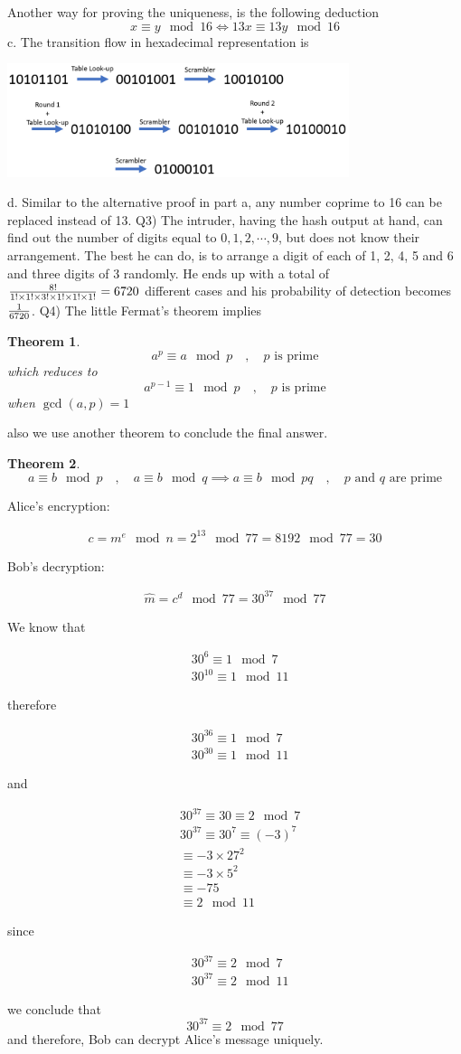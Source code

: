 \documentclass[10pt,letterpaper]{article}
\newcommand{\eqn}[2]{
\begin{equation}
\begin{split}
#1
\label{#2}
\end{split}
\end{equation}
}
\newtheorem{theorem}{Theorem}
\begin{document}
Another way for proving the uniqueness, is the following deduction
$$
x\equiv y\mod 16\iff 13x\equiv 13y\mod 16
$$
c. The transition flow in hexadecimal representation is
\begin{center}
\includegraphics[width=100mm]{Trans.png}
\end{center}
d. Similar to the alternative proof in part a, any number coprime to 16 can be replaced instead of 13.
\newline\newline
Q3) The intruder, having the hash output at hand, can find out the number of digits equal to $0,1,2,\cdots ,9$, but does not know their arrangement. The best he can do, is to arrange a digit of each of 1, 2, 4, 5 and 6 and three digits of 3 randomly. He ends up with a total of 
$
{8!\over 1!\times1!\times3!\times1!\times1!\times1!}=6720
$
 different cases and his probability of detection becomes $1\over 6720$.
\newline\newline
Q4) The little Fermat's theorem implies
\begin{theorem}
$$
a^p\equiv a\mod p\quad,\quad p\text{ is prime}
$$
which reduces to
$$
a^{p-1}\equiv 1\mod p\quad,\quad p\text{ is prime}
$$
when $\gcd(a,p)=1$
\end{theorem}
also we use another theorem to conclude the final answer.
\begin{theorem}
$$
a\equiv b\mod p\quad,\quad a\equiv b\mod q\implies a\equiv b\mod pq\quad,\quad p\text{ and }q\text{ are prime}
$$
\end{theorem}
Alice's encryption:
\eqn{
c=m^e\mod n=2^{13}\mod 77=8192\mod 77=30
}{}
Bob's decryption:
\eqn{
\hat m=c^d\mod 77=30^{37}\mod 77
}{}
We know that
\eqn{
&30^6\equiv 1\mod 7
\\&
30^{10}\equiv 1\mod 11
}{}
therefore
\eqn{
&30^{36}\equiv 1\mod 7
\\&
30^{30}\equiv 1\mod 11
}{}
and
\eqn{
&30^{37}\equiv 30\equiv2\mod 7
\\&
30^{37}\equiv 30^7\equiv (-3)^7
\\&
\equiv -3\times 27^2
\\&
\equiv -3\times 5^2
\\&
\equiv -75
\\&
\equiv 2\mod 11
}{}
since
\eqn{
&30^{37}\equiv 2\mod 7
\\&30^{37}\equiv 2\mod 11
}{}
we conclude that
$$
30^{37}\equiv 2\mod 77
$$
and therefore, Bob can decrypt Alice's message uniquely.
\end{document}
